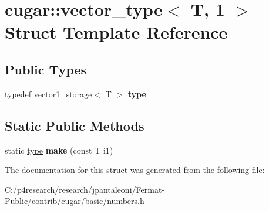 \hypertarget{structcugar_1_1vector__type_3_01_t_00_011_01_4}{}\section{cugar\+:\+:vector\+\_\+type$<$ T, 1 $>$ Struct Template Reference}
\label{structcugar_1_1vector__type_3_01_t_00_011_01_4}
\subsection*{Public Types}
\begin{DoxyCompactItemize}
\item 
\mbox{\label{structcugar_1_1vector__type_3_01_t_00_011_01_4_a29e50ed53b127b858f8e526b08f7279b}} 
typedef \hyperlink{structcugar_1_1vector1__storage}{vector1\+\_\+storage}$<$ T $>$ {\bfseries type}
\end{DoxyCompactItemize}
\subsection*{Static Public Methods}
\begin{DoxyCompactItemize}
\item 
\mbox{\label{structcugar_1_1vector__type_3_01_t_00_011_01_4_a2193abaad06741c310675abe94ada131}} 
static \hyperlink{structcugar_1_1vector1__storage}{type} {\bfseries make} (const T i1)
\end{DoxyCompactItemize}


The documentation for this struct was generated from the following file\+:\begin{DoxyCompactItemize}
\item 
C\+:/p4research/research/jpantaleoni/\+Fermat-\/\+Public/contrib/cugar/basic/numbers.\+h\end{DoxyCompactItemize}
